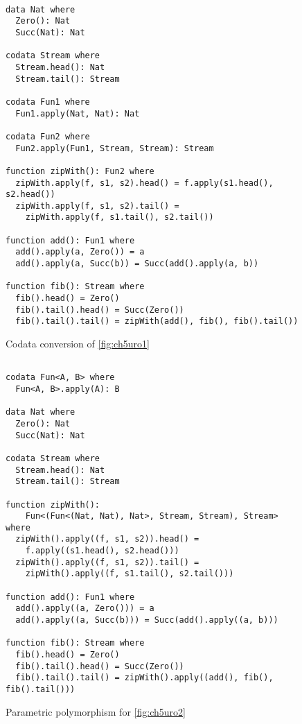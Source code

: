 \begin{figure}
\begin{lstlisting}

data Nat where
  Zero(): Nat
  Succ(Nat): Nat

codata Stream where
  Stream.head(): Nat
  Stream.tail(): Stream

codata Fun1 where
  Fun1.apply(Nat, Nat): Nat

codata Fun2 where
  Fun2.apply(Fun1, Stream, Stream): Stream

function zipWith(): Fun2 where
  zipWith.apply(f, s1, s2).head() = f.apply(s1.head(), s2.head())
  zipWith.apply(f, s1, s2).tail() =
    zipWith.apply(f, s1.tail(), s2.tail())

function add(): Fun1 where
  add().apply(a, Zero()) = a
  add().apply(a, Succ(b)) = Succ(add().apply(a, b))

function fib(): Stream where
  fib().head() = Zero()
  fib().tail().head() = Succ(Zero())
  fib().tail().tail() = zipWith(add(), fib(), fib().tail())

\end{lstlisting}
\caption{Codata conversion of \autoref{fig:ch5uro1}}
\label{fig:ch5uro2}
\end{figure}

\begin{figure}
\begin{lstlisting}

codata Fun<A, B> where
  Fun<A, B>.apply(A): B

data Nat where
  Zero(): Nat
  Succ(Nat): Nat

codata Stream where
  Stream.head(): Nat
  Stream.tail(): Stream

function zipWith():
    Fun<(Fun<(Nat, Nat), Nat>, Stream, Stream), Stream> where
  zipWith().apply((f, s1, s2)).head() =
    f.apply((s1.head(), s2.head()))
  zipWith().apply((f, s1, s2)).tail() =
    zipWith().apply((f, s1.tail(), s2.tail()))

function add(): Fun1 where
  add().apply((a, Zero())) = a
  add().apply((a, Succ(b))) = Succ(add().apply((a, b)))

function fib(): Stream where
  fib().head() = Zero()
  fib().tail().head() = Succ(Zero())
  fib().tail().tail() = zipWith().apply((add(), fib(), fib().tail()))

\end{lstlisting}
\caption{Parametric polymorphism for \autoref{fig:ch5uro2}}
\label{fig:ch5uro3}
\end{figure}


